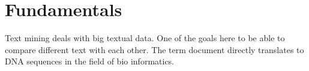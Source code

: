 \section{Fundamentals}

Text mining deals with  big textual data. One of the goals here to be able to compare different text with each other. The term document directly translates to DNA sequences in the field of bio informatics.\\




